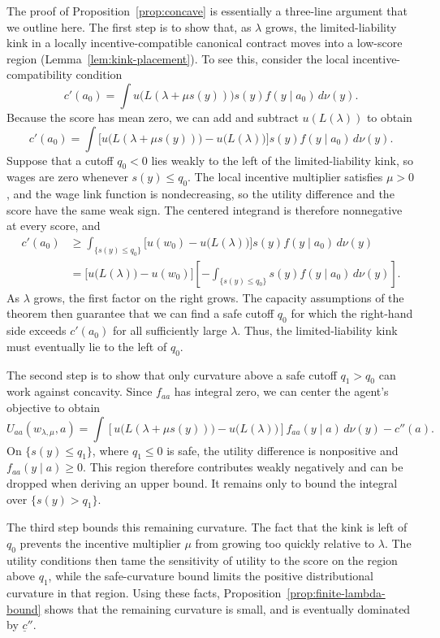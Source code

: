 The proof of Proposition~\ref{prop:concave} is essentially a three-line
argument that we outline here.  The first step is to show that, as $\lambda$ grows, the
limited-liability kink in a locally incentive-compatible canonical contract
moves into a low-score region (Lemma~\ref{lem:kink-placement}).  To see this,
consider the local incentive-compatibility condition
\[
    c'(a_0)
    =\int u\bigl(L(\lambda+\mu s(y))\bigr)s(y)
      f(y\mid a_0)\,d\nu(y).
\]
Because the score has mean zero, we can add and subtract $u(L(\lambda))$ to
obtain
\[
    c'(a_0)
    =\int\bigl[u\bigl(L(\lambda+\mu s(y))\bigr)
                       -u\bigl(L(\lambda)\bigr)\bigr]s(y)
      f(y\mid a_0)\,d\nu(y).
\]
Suppose that a cutoff $q_0<0$ lies weakly to the left of the limited-liability
kink, so wages are
zero whenever $s(y)\leq q_0$.  The local incentive multiplier satisfies
$\mu>0$, and the wage link function is nondecreasing, so the utility difference and
the score have the same weak sign.  The centered integrand is therefore
nonnegative at every score, and
\begin{align*}
    c'(a_0)
    &\geq \int_{\{s(y)\leq q_0\}}
       \bigl[u(w_0)-u\bigl(L(\lambda)\bigr)\bigr]s(y)
       f(y\mid a_0)\,d\nu(y)\\
    &=\bigl[u\bigl(L(\lambda)\bigr)-u(w_0)\bigr]
      \left[-\int_{\{s(y)\leq q_0\}}s(y)f(y\mid a_0)\,d\nu(y)\right].
\end{align*}
As $\lambda$ grows, the first factor on the right grows.  The capacity
assumptions of the theorem then guarantee that we can find a safe cutoff $q_0$
for which the right-hand side exceeds $c'(a_0)$ for all sufficiently large
$\lambda$.  Thus, the limited-liability kink must eventually lie to the left
of $q_0$.

The second step is to show that only curvature above a safe cutoff $q_1 > q_0$ can
work against concavity.  Since $f_{aa}$ has integral zero, we can center
the agent's objective to obtain
\[
    U_{aa}(w_{\lambda,\mu},a)
    =\int\!\left[u\bigl(L(\lambda+\mu s(y))\bigr)
                  -u\bigl(L(\lambda)\bigr)\right]
      f_{aa}(y\mid a)\,d\nu(y)-c''(a).
\]
On $\{s(y)\leq q_1\}$, where $q_1\leq0$ is safe, the utility difference is
nonpositive and $f_{aa}(y\mid a)\geq0$.  This region therefore contributes
weakly negatively and can be dropped when deriving an upper bound.  It remains
only to bound the integral over $\{s(y)>q_1\}$.

The third step bounds this remaining curvature.  The fact that the kink is left of $q_0$ prevents the
incentive multiplier $\mu$ from growing too quickly relative to $\lambda$.
The utility conditions then tame the sensitivity of utility to the score on
the region above $q_1$, while the safe-curvature bound limits the positive
distributional curvature in that region.  Using these facts, Proposition~\ref{prop:finite-lambda-bound} shows that the remaining curvature is small, and is eventually dominated by $\underline c''$.

